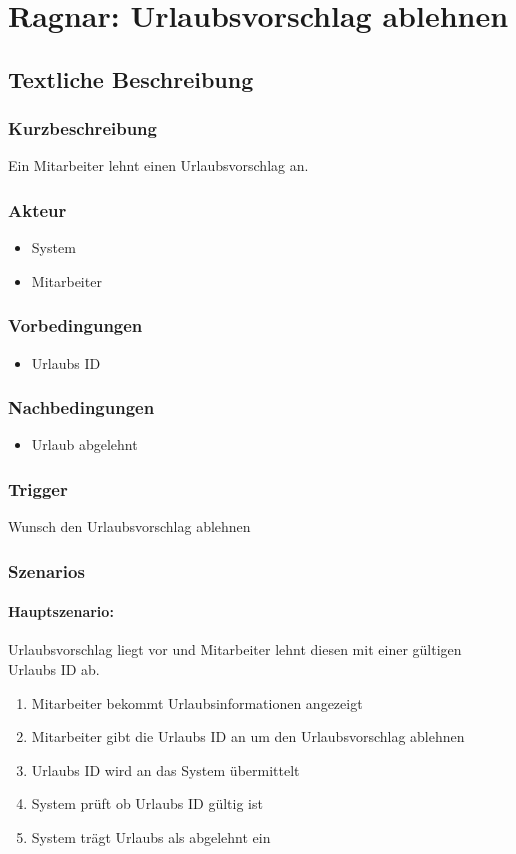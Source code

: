 \section{Ragnar: Urlaubsvorschlag ablehnen}

\subsection{Textliche Beschreibung}
 
\subsubsection{Kurzbeschreibung}
Ein Mitarbeiter lehnt einen Urlaubsvorschlag an.
\subsubsection{Akteur}
\begin{itemize}
\item System
\item Mitarbeiter
\end{itemize}
\subsubsection{Vorbedingungen}
\begin{itemize}
\item Urlaubs ID
\end{itemize}

\subsubsection{Nachbedingungen}
\begin{itemize}
\item Urlaub abgelehnt
\end{itemize}
\subsubsection{Trigger}
Wunsch den Urlaubsvorschlag ablehnen

\subsubsection{Szenarios}
\paragraph{Hauptszenario:}Urlaubsvorschlag liegt vor und Mitarbeiter lehnt diesen mit einer gültigen Urlaubs ID ab.
\begin{enumerate}
	\item Mitarbeiter bekommt Urlaubsinformationen angezeigt
	\item Mitarbeiter gibt die Urlaubs ID an um den Urlaubsvorschlag ablehnen
	\item Urlaubs ID wird an das System übermittelt
	\item System prüft ob Urlaubs ID gültig ist
	\item System trägt Urlaubs als abgelehnt ein
\end{enumerate}

